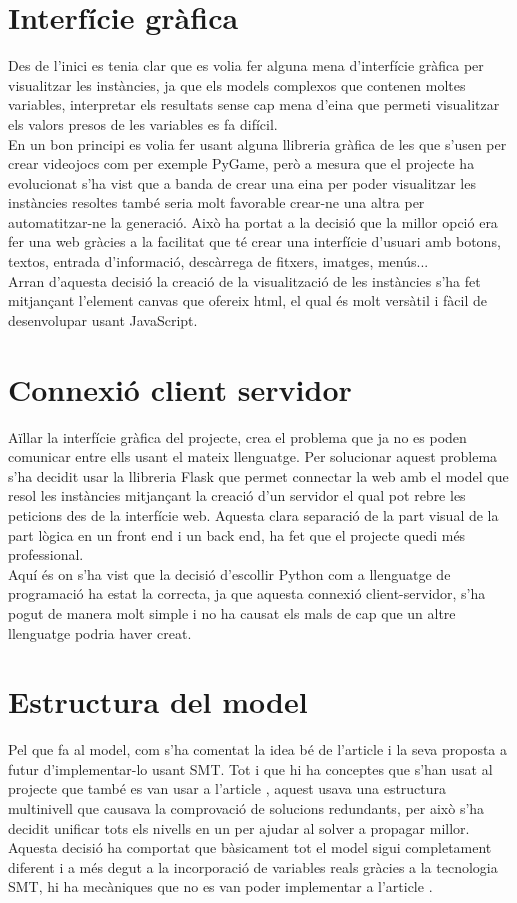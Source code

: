 \section{Interfície gràfica}
Des de l'inici es tenia clar que es volia fer alguna mena d'interfície gràfica per visualitzar les instàncies, ja que els models complexos que contenen moltes variables, interpretar els resultats sense cap mena d'eina que permeti visualitzar els valors presos de les variables es fa difícil.\\
En un bon principi es volia fer usant alguna llibreria gràfica de les que s'usen per crear videojocs com per exemple PyGame, però a mesura que el projecte ha evolucionat s'ha vist que a banda de crear una eina per poder visualitzar les instàncies resoltes també seria molt favorable crear-ne una altra per automatitzar-ne la generació. Això ha portat a la decisió que la millor opció era fer una web gràcies a la facilitat que té crear una interfície d'usuari amb botons, textos, entrada d'informació, descàrrega de fitxers, imatges, menús...\\
Arran d'aquesta decisió la creació de la visualització de les instàncies s'ha fet mitjançant l'element canvas que ofereix html, el qual és molt versàtil i fàcil de desenvolupar usant JavaScript.\\

\section{Connexió client servidor}
Aïllar la interfície gràfica del projecte, crea el problema que ja no es poden comunicar entre ells usant el mateix llenguatge. Per solucionar aquest problema s'ha decidit usar la llibreria Flask que permet connectar la web amb el model que resol les instàncies mitjançant la creació d'un servidor el qual pot rebre les peticions des de la interfície web. Aquesta clara separació de la part visual de la part lògica en un front end i un back end, ha fet que el projecte quedi més professional.\\
Aquí és on s'ha vist que la decisió d'escollir Python com a llenguatge de programació ha estat la correcta, ja que aquesta connexió client-servidor, s'ha pogut de manera molt simple i no ha causat els mals de cap que un altre llenguatge podria haver creat.

\section{Estructura del model}
Pel que fa al model, com s'ha comentat la idea bé de l'article \cite{arxivpaper} i la seva proposta a futur d'implementar-lo usant SMT. Tot i que hi ha conceptes que s'han usat al projecte que també es van usar a l'article \cite{arxivpaper}, aquest usava una estructura multinivell que causava la comprovació de solucions redundants, per això s'ha decidit unificar tots els nivells en un per ajudar al solver a propagar millor. Aquesta decisió ha comportat que bàsicament tot el model sigui completament diferent i a més degut a la incorporació de variables reals gràcies a la tecnologia SMT, hi ha mecàniques que no es van poder implementar a l'article \cite{arxivpaper}.\\

